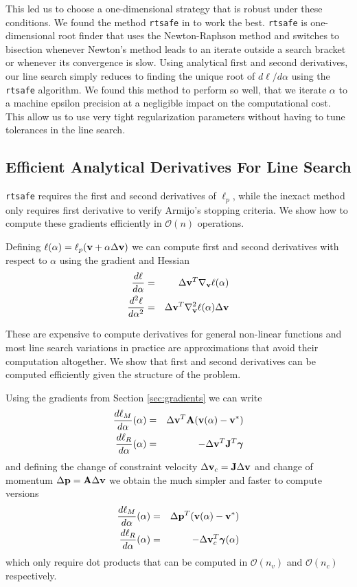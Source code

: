 This led us to choose a one-dimensional strategy that is robust under these
conditions. We found the method \verb;rtsafe; in \cite[\S
9.4]{bib:numerical_recipes} to work the best. \verb;rtsafe; is one-dimensional
root finder that uses the Newton-Raphson method and switches to bisection
whenever Newton's method leads to an iterate outside a search bracket or
whenever its convergence is slow. Using analytical first and second derivatives,
our line search simply reduces to finding the unique root of $d\ell/d\alpha$
using the \verb;rtsafe; algorithm. We found this method to perform so well, that
we iterate $\alpha$ to a machine epsilon precision at a negligible impact on the
computational cost. This allow us to use very tight regularization parameters
without having to tune tolerances in the line search.

\subsection{Efficient Analytical Derivatives For Line Search}

\verb;rtsafe; requires the first and second derivatives of
$\ell_p$, while the inexact method only requires first derivative to verify
Armijo's stopping criteria. We show how to compute these gradients efficiently
in $\mathcal{O}(n)$ operations.

Defining $\ell(\alpha) = \ell_p({\mathbf{v}}+\alpha\Delta{\mathbf{v}})$ we can
compute first and second derivatives with respect to $\alpha$ using the gradient
and Hessian
\begin{eqnarray}
	\frac{d\ell}{d\alpha}&=&\Delta{\mathbf{v}}^T\nabla_{\mathbf{v}}\ell(\alpha)\nonumber\\
	\frac{d^2\ell}{d\alpha^2}&=&\Delta{\mathbf{v}}^T\nabla_{\mathbf{v}}^2\ell(\alpha)\Delta{\mathbf{v}}\nonumber
\end{eqnarray}

These are expensive to compute derivatives for general non-linear functions and
most line search variations in practice are approximations that avoid their
computation altogether. We show that first and second derivatives can be
computed efficiently given the structure of the problem.

Using the gradients from Section \ref{sec:gradients} we can write
\begin{eqnarray}
	\frac{d\ell_M}{d\alpha}(\alpha)&=&\Delta{\mathbf{v}}^T{\mathbf{A}}({\mathbf{v}}(\alpha)-{\mathbf{v}}^*)\\
	\frac{d\ell_R}{d\alpha}(\alpha)&=&-\Delta{\mathbf{v}}^T{\mathbf{J}}^T{\bm\gamma}
\end{eqnarray}
and defining the change of constraint velocity
$\Delta{\mathbf{v}}_c={\mathbf{J}}\Delta{\mathbf{v}}$ and change of momentum $\Delta{\mathbf{p}} =
{\mathbf{A}}\Delta{\mathbf{v}}$ we obtain the much simpler and faster to compute versions
\begin{eqnarray}
	\frac{d\ell_M}{d\alpha}(\alpha)&=&\Delta{\mathbf{p}}^T({\mathbf{v}}(\alpha)-{\mathbf{v}}^*)\\
	\frac{d\ell_R}{d\alpha}(\alpha)&=&-\Delta{\mathbf{v}}_c^T{\bm\gamma}(\alpha)
\end{eqnarray}
which only require dot products that can be computed in $\mathcal{O}(n_v)$ and
$\mathcal{O}(n_c)$ respectively.

